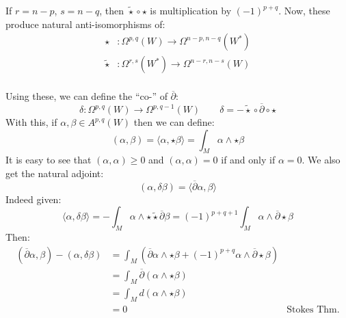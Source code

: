 \documentclass{book}
\begin{document}
If $r = n-p$, $s = n-q$, then $\widetilde{\star}\circ \star$ is multiplication by $(-1)^{p+q}$. Now, these
produce natural anti-isomorphisms of:
\begin{align*}
  \star&: \Omega^{p,q}(W) \to \Omega^{n-p, n-q}(W^*)\\
  \widetilde{\star}&: \Omega^{r,s}(W^*) \to \Omega^{n-r, n-s}(W)\\
\end{align*}

Using these, we can define the ``co-'' of $\overline{\partial}$:
\[
  \delta: \Omega^{p,q}(W) \to \Omega^{p, q-1}(W) \qquad \delta= -\widetilde{\star} \circ
  \overline{\partial} \circ \star
\]
With this, if $\alpha,\beta \in A^{p,q}(W)$ then we can define:
\[
  \left( \alpha,\beta \right) = \langle \alpha, \star \beta \rangle = \int_M \alpha \wedge  \star \beta
\]
It is easy to see that $\left( \alpha,\alpha \right) \ge 0$ and $\left(\alpha,\alpha  \right) = 0$ if and only
if $\alpha = 0$. We also get the natural adjoint:
\[
  \left(\alpha, \delta \beta\right) = \langle \overline{\partial}\alpha, \beta \rangle
\]
Indeed given:
\[
  \langle\alpha, \delta \beta\rangle = - \int_M \alpha \wedge  \star \widetilde{\star}\overline{\partial} \beta = (-1)^{p+q+1} \int_M \alpha \wedge \overline{\partial} \star \beta
\]
Then:
\begin{align*}
    (\overline{\partial}\alpha, \beta) - (\alpha, \delta \beta) &= \int_M (\overline{\partial}\alpha \wedge \star \beta + (-1)^{p+q} \alpha \wedge \overline{\partial} \star \beta) \\
    &= \int_M \overline{\partial}(\alpha \wedge \star \beta) \\
    &= \int_M d(\alpha \wedge \star \beta) \\
    &= 0 & \text{Stokes Thm.}
\end{align*}
\end{document}
